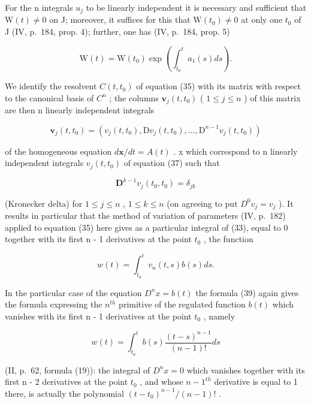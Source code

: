 For the n integrals \(u_{j}\) to be linearly independent it is necessary and sufficient that \(\mathrm{W}(t) \neq 0\) on J; moreover, it suffices for this that \(\mathrm{W}(t_{0}) \neq 0\) at only one \(t_{0}\) of J (IV, p.~184, prop. 4); further, one has (IV, p.~184, prop. 5)

\[
\mathrm{W} (t) = \mathrm{W} (t _ {0}) \exp \left(\int_ {t _ {0}} ^ {t} a _ {1} (s) d s\right).\tag{38}
\]

We identify the resolvent \(C(t, t_{0})\) of equation (35) with its matrix with respect to the canonical basis of \(C^{n}\) ; the columns \(\mathbf{v}_{j}(t, t_{0})\) ( \(1 \leqslant j \leqslant n\) ) of this matrix are then n linearly independent integrals

\[
\mathbf {v} _ {j} (t, t _ {0}) = (v _ {j} (t, t _ {0}), \mathrm{D} v _ {j} (t, t _ {0}), \dots , \mathrm{D} ^ {n - 1} v _ {j} (t, t _ {0}))
\]

of the homogeneous equation \(d\mathbf{x}/dt = A(t)\) . x which correspond to n linearly independent integrals \(v_{j}(t, t_{0})\) of equation (37) such that

\[
\mathbf {D} ^ {k - 1} v _ {j} (t _ {0}, t _ {0}) = \delta_ {j k}
\]

(Kronecker delta) for \(1 \leqslant j \leqslant n\) , \(1 \leqslant k \leqslant n\) (on agreeing to put \(D^{0}v_{j} = v_{j}\) ). It results in particular that the method of variation of parameters (IV, p.~182) applied to equation (35) here gives as a particular integral of (33), equal to 0 together with its first n - 1 derivatives at the point \(t_{0}\) , the function

\[
w (t) = \int_ {t _ {0}} ^ {t} v _ {n} (t, s) b (s) d s.\tag{39}
\]

In the particular case of the equation \(D^{n}x = b(t)\) the formula (39) again gives the formula expressing the \(n^{th}\) primitive of the regulated function \(b(t)\) which vanishes with its first n - 1 derivatives at the point \(t_{0}\) , namely

\[
w (t) = \int_ {t _ {0}} ^ {t} b (s) \frac {(t - s) ^ {n - 1}}{(n - 1) !} d s
\]

(II, p.~62, formula (19)): the integral of \(D^{n}x = 0\) which vanishes together with its first n - 2 derivatives at the point \(t_{0}\) , and whose \(n - 1^{th}\) derivative is equal to 1 there, is actually the polynomial \((t - t_{0})^{n-1}/(n - 1)!\) .

